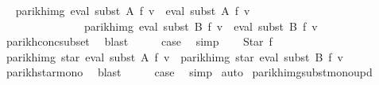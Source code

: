 \begin{isabellebody}
\ \isamarkupfalse%
\ {\isachardoublequoteopen}parikh{\isacharunderscore}{\kern0pt}img\ {\isacharparenleft}{\kern0pt}eval\ {\isacharparenleft}{\kern0pt}subst\ A\ f{}{\isacharparenright}{\kern0pt}\ v\ {\isacharat}{\kern0pt}{\isacharat}{\kern0pt}\ eval\ {\isacharparenleft}{\kern0pt}subst\ A\ f{}{\isacharparenright}{\kern0pt}\ v{\isacharparenright}{\kern0pt}\isanewline
\ \ \ \ \ \ \ \ \ \ \ \ \ \ {\isasymsubseteq}\ parikh{\isacharunderscore}{\kern0pt}img\ {\isacharparenleft}{\kern0pt}eval\ {\isacharparenleft}{\kern0pt}subst\ B\ f{}{\isacharparenright}{\kern0pt}\ v\ {\isacharat}{\kern0pt}{\isacharat}{\kern0pt}\ eval\ {\isacharparenleft}{\kern0pt}subst\ B\ f{}{\isacharparenright}{\kern0pt}\ v{\isacharparenright}{\kern0pt}{\isachardoublequoteclose}\isanewline
\ \ \ \ \isamarkupfalse%
\ parikh{\isacharunderscore}{\kern0pt}conc{\isacharunderscore}{\kern0pt}subset\ \isamarkupfalse%
\ blast\isanewline
\ \ \isamarkupfalse%
\ \isamarkupfalse%
\ {\isacharquery}{\kern0pt}case\ \isamarkupfalse%
\ simp\isanewline
{}\isamarkupfalse%
\isanewline
\ \ \isamarkupfalse%
\ {\isacharparenleft}{\kern0pt}Star\ f{\isacharparenright}{\kern0pt}\isanewline
\ \ \isamarkupfalse%
\ \isamarkupfalse%
\ {\isachardoublequoteopen}parikh{\isacharunderscore}{\kern0pt}img\ {\isacharparenleft}{\kern0pt}star\ {\isacharparenleft}{\kern0pt}eval\ {\isacharparenleft}{\kern0pt}subst\ A\ f{\isacharparenright}{\kern0pt}\ v{\isacharparenright}{\kern0pt}{\isacharparenright}{\kern0pt}\ {\isasymsubseteq}\ parikh{\isacharunderscore}{\kern0pt}img\ {\isacharparenleft}{\kern0pt}star\ {\isacharparenleft}{\kern0pt}eval\ {\isacharparenleft}{\kern0pt}subst\ B\ f{\isacharparenright}{\kern0pt}\ v{\isacharparenright}{\kern0pt}{\isacharparenright}{\kern0pt}{\isachardoublequoteclose}\isanewline
\ \ \ \ \isamarkupfalse%
\ parikh{\isacharunderscore}{\kern0pt}star{\isacharunderscore}{\kern0pt}mono\ \isamarkupfalse%
\ blast\isanewline
\ \ \isamarkupfalse%
\ \isamarkupfalse%
\ {\isacharquery}{\kern0pt}case\ \isamarkupfalse%
\ simp\isanewline
{}\isamarkupfalse%
\ auto%
\endisatagproof
{\isafoldproof}%
%
\isadelimproof
\isanewline
%
\endisadelimproof
\isanewline
{}\isamarkupfalse%
\ parikh{\isacharunderscore}{\kern0pt}img{\isacharunderscore}{\kern0pt}subst{\isacharunderscore}{\kern0pt}mono{\isacharunderscore}{\kern0pt}upd{\isacharcolon}{\kern0pt}\isanewline

\end{isabellebody}
